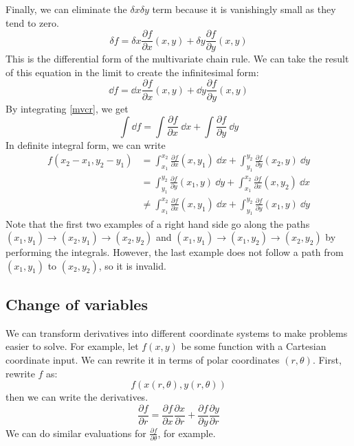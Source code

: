 Finally, we can eliminate the \(\delta x \delta y\) term because it is vanishingly small as they tend to zero.
\begin{equation}
	\delta f = \delta x \frac{\partial f}{\partial x}(x, y) +
	\delta y\frac{\partial f}{\partial y}(x, y)
\end{equation}
This is the differential form of the multivariate chain rule.
We can take the result of this equation in the limit to create the infinitesimal form:
\begin{equation}\label{mvcr}
	\dd{f} = \dd{x} \frac{\partial f}{\partial x}(x, y) +
	\dd{y}\frac{\partial f}{\partial y}(x, y)
\end{equation}
By integrating \eqref{mvcr}, we get
\[
	\int \dd{f} = \int \frac{\partial f}{\partial x}\ \dd{x} + \int \frac{\partial f}{\partial y}\ \dd{y}
\]
In definite integral form, we can write
\begin{align*}
	f(x_2 - x_1, y_2 - y_1) & = \int_{x_1}^{x_2} \frac{\partial f}{\partial x}(x, y_1)\ \dd{x} + \int_{y_1}^{y_2} \frac{\partial f}{\partial y}(x_2, y)\ \dd{y}    \\
	                        & = \int_{y_1}^{y_2} \frac{\partial f}{\partial y}(x_1, y)\ \dd{y} + \int_{x_1}^{x_2} \frac{\partial f}{\partial x}(x, y_2)\ \dd{x}    \\
	                        & \neq \int_{x_1}^{x_2} \frac{\partial f}{\partial x}(x, y_1)\ \dd{x} + \int_{y_1}^{y_2} \frac{\partial f}{\partial y}(x_1, y)\ \dd{y}
\end{align*}
Note that the first two examples of a right hand side go along the paths \((x_1, y_1) \to (x_2, y_1) \to (x_2, y_2)\) and \((x_1, y_1) \to (x_1, y_2) \to (x_2, y_2)\) by performing the integrals.
However, the last example does not follow a path from \((x_1, y_1)\) to \((x_2, y_2)\), so it is invalid.

\subsection{Change of variables}
We can transform derivatives into different coordinate systems to make problems easier to solve.
For example, let \(f(x, y)\) be some function with a Cartesian coordinate input.
We can rewrite it in terms of polar coordinates \((r, \theta)\).
First, rewrite \(f\) as:
\[
	f(x(r, \theta), y(r, \theta))
\]
then we can write the derivatives.
\[
	\frac{\partial f}{\partial r} = \frac{\partial f}{\partial x}\frac{\partial x}{\partial r} + \frac{\partial f}{\partial y}\frac{\partial y}{\partial r}
\]
We can do similar evaluations for \(\frac{\partial f}{\partial \theta}\), for example.

